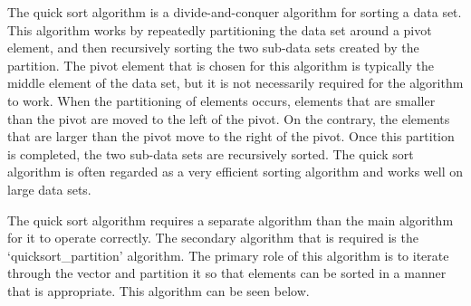 \documentclass[a4paper,9pt]{article}
\begin{document}
The quick sort algorithm is a divide-and-conquer algorithm for sorting a data set. This algorithm works by repeatedly partitioning the data set around a pivot element, and then recursively sorting the two sub-data sets
created by the partition. The pivot element that is chosen for this algorithm is typically the middle element of the data set, but it is not necessarily required for the algorithm to work. When the partitioning of elements
occurs, elements that are smaller than the pivot are moved to the left of the pivot. On the contrary, the elements that are larger than the pivot move to the right of the pivot. Once this partition is completed, the two
sub-data sets are recursively sorted. The quick sort algorithm is often regarded as a very efficient sorting algorithm and works well on large data sets.

The quick sort algorithm requires a separate algorithm than the main algorithm for it to operate correctly. The secondary algorithm that is required is the `quicksort\_partition' algorithm. The primary role of this algorithm
is to iterate through the vector and partition it so that elements can be sorted in a manner that is appropriate. This algorithm can be seen below.
\end{document}
